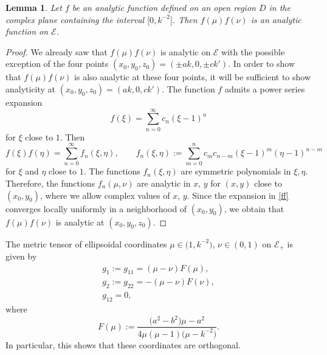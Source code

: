 \documentclass[10pt,a4paper]{amsart}
\newtheorem{Lemma}[thm]{Lemma}
\newcommand{\E}{\mathcal{E}}
\numberwithin{equation}{section}
\begin{document}
\begin{Lemma}\label{l1}
Let $f$ be an analytic function defined on an open region $D$ in the complex plane containing the interval $\bigl[0,k^{-2}\bigr]$.
Then $f(\mu)f(\nu)$ is an analytic function on $\E$.
\end{Lemma}
\begin{proof}
We already saw that $f(\mu)f(\nu)$ is analytic on $\E$ with the possible exception of the four points
$(x_0,y_0,z_0)=(\pm ak,0,\pm ck')$.
In order to show that $f(\mu)f(\nu)$ is also analytic at these four points, it will be
sufficient to show analyticity at $(x_0,y_0,z_0)=(ak,0,ck')$.
The function $f$ admits a power series expansion
\[ f(\xi)=\sum_{n=0}^\infty c_n (\xi-1)^n \]
for $\xi$ close to $1$.
Then
\begin{equation}\label{ff}
 f(\xi)f(\eta)=\sum_{n=0}^\infty f_n(\xi,\eta),\qquad f_n(\xi,\eta):=\sum_{m=0}^n c_mc_{n-m} (\xi-1)^m(\eta-1)^{n-m}
 \end{equation}
for $\xi$ and $\eta$ close to $1$.
The functions $f_n(\xi,\eta)$ are symmetric polynomials in $\xi,\eta$. Therefore, the functions
$f_n(\mu,\nu)$ are analytic in $x$, $y$
for $(x,y)$ close to $(x_0,y_0)$, where we allow complex values of $x$, $y$.
Since the expansion in \eqref{ff} converges locally uniformly in a neighborhood of $(x_0,y_0)$, we obtain
that $f(\mu)f(\nu)$ is analytic at $(x_0,y_0,z_0)$.
\end{proof}

The metric tensor of ellipsoidal coordinates $\mu\in\bigl(1,k^{-2}\bigr)$, $\nu\in(0,1)$ on $\E_+$ is given by
\begin{gather}
 g_1 := g_{11}=(\mu-\nu) F(\mu),\label{gg1}\\
 g_2 := g_{22}=-(\mu-\nu) F(\nu),\label{gg2}\\
 g_{12} = 0,\label{gg3}
\end{gather}
where
\[ F(\mu):=\frac{\bigl(a^2-b^2\bigr)\mu-a^2}{4\mu(\mu-1)\bigl(\mu-k^{-2}\bigr)} .\]
In particular, this shows that these coordinates are orthogonal.
\end{document}
